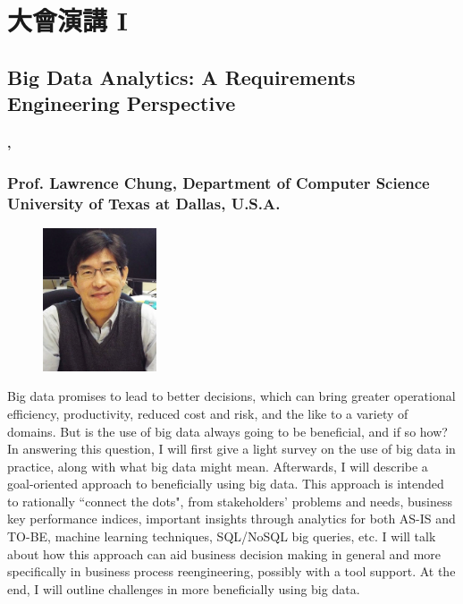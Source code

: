 \documentclass[12pt,oneside,a4paper]{book}
\begin{document}
\subsubsection*{\ChairFourD}
\ListFourD

\chapter*{大會演講 I }
%

\section*{Big Data Analytics: A Requirements Engineering Perspective}
\subsubsection*{\TimeKeynoteOne, \LocationKeynoteOne}

\subsection*{Prof. Lawrence Chung, Department of Computer Science University of Texas at Dallas, U.S.A.}

\begin{figure}
	\includegraphics[width=0.3\textwidth]{images/chung.png}    
\end{figure}

Big data promises to lead to better decisions, which can bring greater operational efficiency, productivity, reduced cost and risk, and the like to a variety of domains. But is the use of big data always going to be beneficial, and if so how? In answering this question, I will first give a light survey on the use of big data in practice, along with what big data might mean. Afterwards, I will describe a goal-oriented approach to beneficially using big data. This approach is intended to rationally ``connect the dots", from stakeholders’ problems and needs, business key performance indices, important insights through analytics for both AS-IS and TO-BE, machine learning techniques, SQL/NoSQL big queries, etc. I will talk about how this approach can aid business decision making in general and more specifically in business process reengineering, possibly with a tool support. At the end, I will outline challenges in more beneficially using big data.
\end{document}
